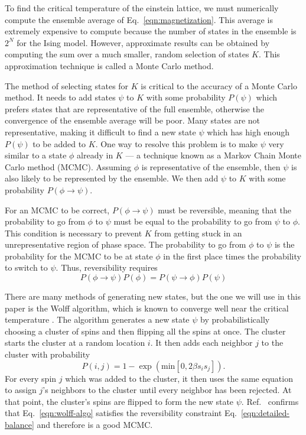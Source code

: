 \documentclass[
  amsmath,
  amssymb,
  aps,
  twocolumn,
  nofootinbib,
  nolongbibliography,
  floatfix,
]{revtex4-2}
\newcommand{\parens}[1]{\left ( #1 \right )}
\begin{document}
To find the critical temperature of the einstein lattice, we must numerically compute the ensemble average of Eq.~\ref{eqn:magnetization}. This average is extremely expensive to compute because the number of states in the ensemble is $2^N$ for the Ising model. However, approximate results can be obtained by computing the sum over a much smaller, random selection of states $K$. This approximation technique is called a Monte Carlo method.

The method of selecting states for $K$ is critical to the accuracy of a Monte Carlo method. It needs to add states $\psi$ to $K$ with some probability $P(\psi)$ which prefers states that are representative of the full ensemble, otherwise the convergence of the ensemble average will be poor. Many states are not representative, making it difficult to find a new state $\psi$ which has high enough $P(\psi)$ to be added to $K$. One way to resolve this problem is to make $\psi$ very similar to a state $\phi$ already in $K$ --- a technique known as a Markov Chain Monte Carlo method (MCMC). Assuming $\phi$ is representative of the ensemble, then $\psi$ is also likely to be represented by the ensemble. We then add $\psi$ to $K$ with some probability $P(\phi \rightarrow \psi)$.

For an MCMC to be correct, $P(\phi \rightarrow \psi)$ must be reversible, meaning that the probability to go from $\phi$ to $\psi$ must be equal to the probability to go from $\psi$ to $\phi$. This condition is necessary to prevent $K$ from getting stuck in an unrepresentative region of phase space. The probability to go from $\phi$ to $\psi$ is the probability for the MCMC to be at state $\phi$ in the first place times the probability to switch to $\psi$. Thus, reversibility requires
\begin{equation}
  P(\phi \rightarrow \psi)P(\phi) = P(\psi \rightarrow \phi)P(\psi)
  \label{eqn:detailed-balance}
\end{equation}

There are many methods of generating new states, but the one we will use in this paper is the Wolff algorithm, which is known to converge well near the critical temperature \cite{wolff1989collective}. The algorithm generates a new state $\psi$ by probabilistically choosing a cluster of spins and then flipping all the spins at once. The cluster starts the cluster at a random location $i$. It then adds each neighbor $j$ to the cluster with probability
\begin{equation}
  P(i,j) = 1 - \exp\parens{\mathrm{min}\left[0, 2\beta s_i s_j \right]}.
  \label{eqn:wolff-algo}
\end{equation}
For every spin $j$ which was added to the cluster, it then uses the same equation to assign $j$'s neighbors to the cluster until every neighbor has been rejected. At that point, the cluster's spins are flipped to form the new state $\psi$. Ref.~\cite{wolff1989collective} confirms that Eq.~\ref{eqn:wolff-algo} satisfies the reversibility constraint Eq.~\ref{eqn:detailed-balance} and therefore is a good MCMC.
\end{document}
